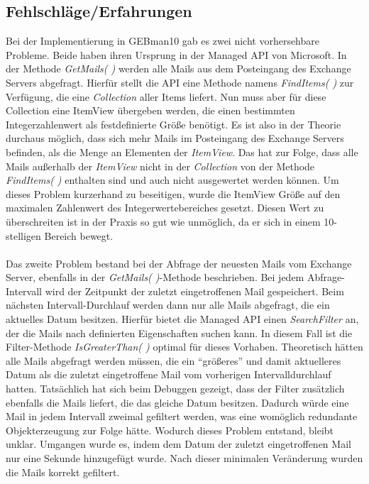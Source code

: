 \subsection{Fehlschläge/Erfahrungen}
\noindent
Bei der Implementierung in GEBman10 gab es zwei nicht vorhersehbare Probleme. Beide haben ihren Ursprung in der Managed API von Microsoft. In der Methode \textit{GetMails( )} werden alle Mails aus dem Posteingang des Exchange Servers abgefragt. Hierfür stellt die API eine Methode namens \textit{FindItems( )} zur Verfügung, die eine \textit{Collection} aller Items liefert. Nun muss aber für diese Collection eine ItemView übergeben werden, die einen bestimmten Integerzahlenwert als festdefinierte Größe benötigt. Es ist also in der Theorie durchaus möglich, dass sich mehr Mails im Posteingang des Exchange Servers befinden, als die Menge an Elementen der \textit{ItemView}. Das hat zur Folge, dass alle Mails außerhalb der \textit{ItemView} nicht in der \textit{Collection} von der Methode \textit{FindItems( )} enthalten sind und auch nicht ausgewertet werden können. Um dieses Problem kurzerhand zu beseitigen, wurde die ItemView Größe auf den maximalen Zahlenwert des Integerwertebereiches gesetzt. Diesen Wert zu überschreiten ist in der Praxis so gut wie unmöglich, da er sich in einem 10-stelligen Bereich bewegt.\\\\

\noindent
Das zweite Problem bestand bei der Abfrage der neuesten Mails vom Exchange Server, ebenfalls in der \textit{GetMails( )}-Methode beschrieben. Bei jedem Abfrage-Intervall wird der Zeitpunkt der zuletzt eingetroffenen Mail gespeichert. Beim nächsten Intervall-Durchlauf werden dann nur alle Mails abgefragt, die ein aktuelles Datum besitzen. Hierfür bietet die Managed API einen \textit{SearchFilter} an, der die Mails nach definierten Eigenschaften suchen kann. In diesem Fall ist die Filter-Methode \textit{IsGreaterThan( )} optimal für dieses Vorhaben. Theoretisch hätten alle Mails abgefragt werden müssen, die ein \enquote{größeres} und damit aktuelleres Datum als die zuletzt eingetroffene Mail vom vorherigen Intervalldurchlauf hatten. Tatsächlich hat sich beim Debuggen gezeigt, dass der Filter zusätzlich ebenfalls die Mails liefert, die das gleiche Datum besitzen. Dadurch würde eine Mail in jedem Intervall zweimal gefiltert werden, was eine womöglich redundante Objekterzeugung zur Folge hätte. Wodurch dieses Problem entstand, bleibt unklar. Umgangen wurde es, indem dem Datum der zuletzt eingetroffenen Mail nur eine Sekunde hinzugefügt wurde. Nach dieser minimalen Veränderung wurden die Mails korrekt gefiltert.


